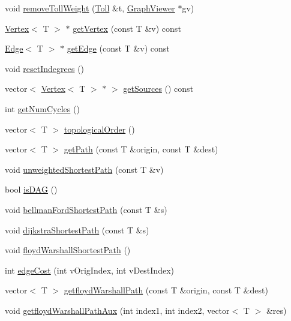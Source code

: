 \begin{DoxyCompactItemize}
void \hyperlink{class_graph_adbb6e61a997bdd22911d5f38361d38bd}{remove\+Toll\+Weight} (\hyperlink{class_toll}{Toll} \&t, \hyperlink{class_graph_viewer}{Graph\+Viewer} $\ast$gv)
\item 
\hyperlink{class_vertex}{Vertex}$<$ T $>$ $\ast$ \hyperlink{class_graph_a08a95472b0d9bd7321660940807af060}{get\+Vertex} (const T \&v) const 
\item 
\hyperlink{class_edge}{Edge}$<$ T $>$ $\ast$ \hyperlink{class_graph_a45b90c42b1fd441a721cb3af43d07f07}{get\+Edge} (const T \&v) const 
\item 
void \hyperlink{class_graph_af34eb86d804272e6e3e221a9ed688c53}{reset\+Indegrees} ()
\item 
vector$<$ \hyperlink{class_vertex}{Vertex}$<$ T $>$ $\ast$ $>$ \hyperlink{class_graph_aa1a3c754f51a888e25dff2b26dfb85fc}{get\+Sources} () const 
\item 
int \hyperlink{class_graph_a694dff81073c38b669057f0c6bd4cbb1}{get\+Num\+Cycles} ()
\item 
vector$<$ T $>$ \hyperlink{class_graph_a2e75512c089c3916dda9cf61e1185d9d}{topological\+Order} ()
\item 
vector$<$ T $>$ \hyperlink{class_graph_ab4054ca572c10669dd3e05d6d41c116c}{get\+Path} (const T \&origin, const T \&dest)
\item 
void \hyperlink{class_graph_ae5264597aacaf4f45819e96a6d6c89aa}{unweighted\+Shortest\+Path} (const T \&v)
\item 
bool \hyperlink{class_graph_ab49d07c2bd6b8b30d5ae82bc558b821a}{is\+D\+A\+G} ()
\item 
void \hyperlink{class_graph_a1d6769b79beaa76f78fd9c9209833bef}{bellman\+Ford\+Shortest\+Path} (const T \&s)
\item 
void \hyperlink{class_graph_a445a38cf4045797198eae2b818b602de}{dijkstra\+Shortest\+Path} (const T \&s)
\item 
void \hyperlink{class_graph_ae5161f4408bf1ead2b29d19d67fb04ee}{floyd\+Warshall\+Shortest\+Path} ()
\item 
int \hyperlink{class_graph_a7e137f1ef838395ac1044a944fa54448}{edge\+Cost} (int v\+Orig\+Index, int v\+Dest\+Index)
\item 
vector$<$ T $>$ \hyperlink{class_graph_ab23d1dae92a7f2b29dcb91a94336674c}{getfloyd\+Warshall\+Path} (const T \&origin, const T \&dest)
\item 
void \hyperlink{class_graph_aad1eda4beb8425d03ed1f3b8af397563}{getfloyd\+Warshall\+Path\+Aux} (int index1, int index2, vector$<$ T $>$ \&res)
\item 

\end{DoxyCompactItemize}
